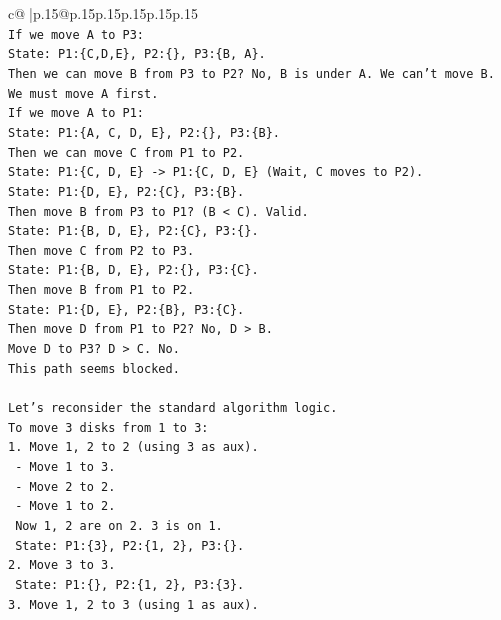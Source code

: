\documentclass{article}
\begin{document}
{\begin{supertabular}{c@{$\;$}|p{.15\linewidth}@{}p{.15\linewidth}p{.15\linewidth}p{.15\linewidth}p{.15\linewidth}p{.15\linewidth}}
{{{\\ 
\texttt{If we move A to P3:} \\
\texttt{State: P1:\{C,D,E\}, P2:\{\}, P3:\{B, A\}.} \\
\texttt{Then we can move B from P3 to P2? No, B is under A. We can't move B.} \\
\texttt{We must move A first.} \\
\texttt{If we move A to P1:} \\
\texttt{State: P1:\{A, C, D, E\}, P2:\{\}, P3:\{B\}.} \\
\texttt{Then we can move C from P1 to P2.} \\
\texttt{State: P1:\{C, D, E\} {-}> P1:\{C, D, E\} (Wait, C moves to P2).} \\
\texttt{State: P1:\{D, E\}, P2:\{C\}, P3:\{B\}.} \\
\texttt{Then move B from P3 to P1? (B < C). Valid.} \\
\texttt{State: P1:\{B, D, E\}, P2:\{C\}, P3:\{\}.} \\
\texttt{Then move C from P2 to P3.} \\
\texttt{State: P1:\{B, D, E\}, P2:\{\}, P3:\{C\}.} \\
\texttt{Then move B from P1 to P2.} \\
\texttt{State: P1:\{D, E\}, P2:\{B\}, P3:\{C\}.} \\
\texttt{Then move D from P1 to P2? No, D > B.} \\
\texttt{Move D to P3? D > C. No.} \\
\texttt{This path seems blocked.} \\
\\ 
\texttt{Let's reconsider the standard algorithm logic.} \\
\texttt{To move 3 disks from 1 to 3:} \\
\texttt{1. Move 1, 2 to 2 (using 3 as aux).} \\
\texttt{   {-} Move 1 to 3.} \\
\texttt{   {-} Move 2 to 2.} \\
\texttt{   {-} Move 1 to 2.} \\
\texttt{   Now 1, 2 are on 2. 3 is on 1.} \\
\texttt{   State: P1:\{3\}, P2:\{1, 2\}, P3:\{\}.} \\
\texttt{2. Move 3 to 3.} \\
\texttt{   State: P1:\{\}, P2:\{1, 2\}, P3:\{3\}.} \\
\texttt{3. Move 1, 2 to 3 (using 1 as aux).} \\
}}}
\end{supertabular}}
\end{document}

